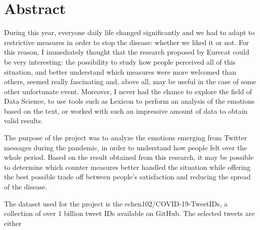 
\chapter*{Abstract} %
\label{abstract}  


During this year, everyone daily life changed significantly and we had to adapt to restrictive measures in order to stop the disease: whether we liked it or not. For this reason, I immediately thought that the research proposed by Eurecat could be very interesting: the possibility to study how people perceived all of this situation, and better understand which measures were more welcomed than others, seemed really fascinating and, above all, may be useful in the case of some other unfortunate event. Moreover, I never had the chance to explore the field of Data Science, to use tools such as Lexicon to perform an analysis of the emotions based on the text, or worked with such an impressive amount of data to obtain valid results.

The purpose of the project was to analyze the emotions emerging from Twitter messages during the pandemic, in order to understand how people felt over the whole period. Based on the result obtained from this research, it may be possible to determine which counter measures better handled the situation while offering the best possible trade off between people's satisfaction and reducing the spread of the disease.

The dataset used for the project is the echen102/COVID-19-TweetIDs, a collection of over 1 billion tweet IDs available on GitHub. The selected tweets are either


